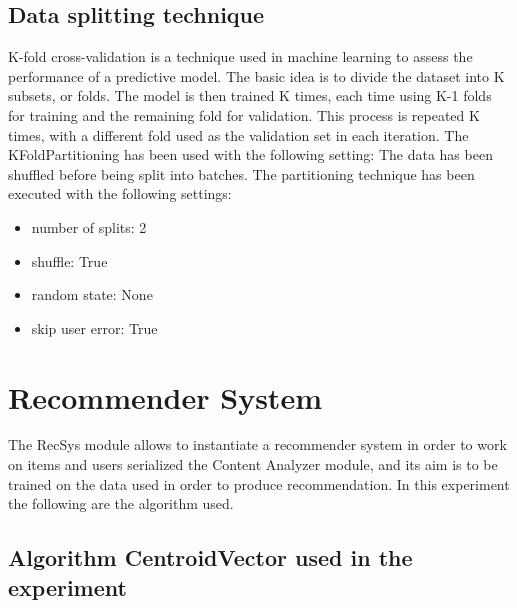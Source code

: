 \documentclass[11pt]{article}
\begin{document}
\hfill\break



\subsection{Data splitting technique}\label{subsec:partitioning}
K-fold cross-validation is a technique used in machine learning to assess the performance of a predictive model.
The basic idea is to divide the dataset into K subsets, or folds.
The model is then trained K times, each time using K-1 folds for training and the remaining fold for validation.
This process is repeated K times, with a different fold used as the validation set in each iteration.
\hfill\break
The KFoldPartitioning has been used with the following setting:
\hfill\break
The data has been shuffled before being split into batches.
The partitioning technique has been executed with the following settings:
\begin{itemize}
    \item number of splits: 2
    \item shuffle: True
    \item random state: None
    \item skip user error: True
\end{itemize}
\hfill\break



\section{Recommender System}\label{sec:recsys}
The RecSys module allows to instantiate a recommender system in order to work on items and users serialized
the Content Analyzer module, and its aim is to be trained on the data used in order to produce recommendation.
In this experiment the following are the algorithm used.



\subsection{Algorithm CentroidVector used in the experiment}\label{subsec:algo_CentroidVector}
\end{document}
